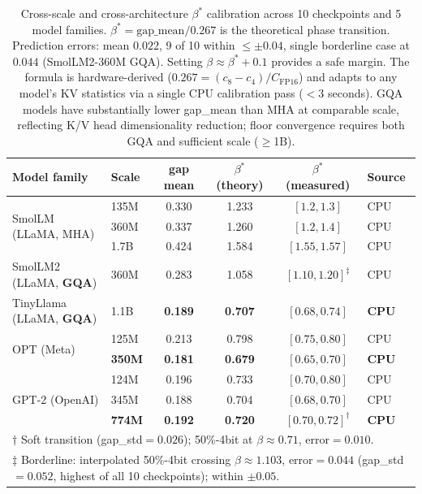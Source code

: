 \documentclass{article}
\begin{document}
\begin{table}[h]
\centering
\caption{Cross-scale and cross-architecture $\beta^*$ calibration across 10 checkpoints and 5 model families. $\beta^* = \text{gap\_mean}/0.267$ is the theoretical phase transition. Prediction errors: mean $0.022$, 9 of 10 within $\leq\pm0.04$, single borderline case at $0.044$ (SmolLM2-360M GQA). Setting $\beta \approx \beta^*{+}0.1$ provides a safe margin. The formula is hardware-derived ($0.267 = (c_8{-}c_4)/C_\text{FP16}$) and adapts to any model's KV statistics via a single CPU calibration pass ($<$3 seconds). GQA models have substantially lower gap\_mean than MHA at comparable scale, reflecting K/V head dimensionality reduction; floor convergence requires both GQA and sufficient scale ($\geq$1B).}
\begin{tabular}{llcccl}
\toprule
Model family & Scale & gap mean & $\beta^*$ (theory) & $\beta^*$ (measured) & Source \\
\midrule
\multirow{3}{*}{SmolLM (LLaMA, MHA)} & 135M & 0.330 & 1.233 & $[1.2, 1.3]$ & CPU \\
 & 360M & 0.337 & 1.260 & $[1.2, 1.4]$ & CPU \\
 & 1.7B & 0.424 & 1.584 & $[1.55, 1.57]$ & CPU \\
\midrule
SmolLM2 (LLaMA, \textbf{GQA}) & 360M & 0.283 & 1.058 & $[1.10, 1.20]^{\ddagger}$ & CPU \\
\midrule
TinyLlama (LLaMA, \textbf{GQA}) & 1.1B & \textbf{0.189} & \textbf{0.707} & $\mathbf{[0.68, 0.74]}$ & \textbf{CPU} \\
\midrule
\multirow{2}{*}{OPT (Meta)} & 125M & 0.213 & 0.798 & $[0.75, 0.80]$ & CPU \\
 & \textbf{350M} & \textbf{0.181} & \textbf{0.679} & $\mathbf{[0.65, 0.70]}$ & \textbf{CPU} \\
\midrule
\multirow{3}{*}{GPT-2 (OpenAI)} & 124M & 0.196 & 0.733 & $[0.70, 0.80]$ & CPU \\
 & 345M & 0.188 & 0.704 & $[0.68, 0.70]$ & CPU \\
 & \textbf{774M} & \textbf{0.192} & \textbf{0.720} & $\mathbf{[0.70, 0.72]}^{\dagger}$ & \textbf{CPU} \\
\bottomrule
\multicolumn{6}{l}{\small $\dagger$ Soft transition (gap\_std$=0.026$); 50\%-4bit at $\beta\approx0.71$, error$=0.010$.} \\
\multicolumn{6}{l}{\small $\ddagger$ Borderline: interpolated 50\%-4bit crossing $\beta\approx1.103$, error$=0.044$ (gap\_std$=0.052$, highest of all 10 checkpoints); within $\pm0.05$.}
\end{tabular}
\label{tab:betastar}
\end{table}
\end{document}
